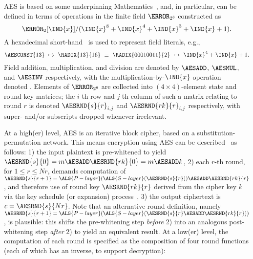 AES is based on some underpinning Mathematics~\cite[Section 4]{FIPS:197},
and, in particular, can be defined in terms of 
operations in the finite field $\F_{2^{  8}}$ constructed as
\[
\F_{2}[\IND{x}] / ( \IND{x}^{8} + \IND{x}^{4} + \IND{x}^{3} + \IND{x} + 1 ) .
\]
A hexadecimal short-hand~\cite[Section 3.2]{FIPS:197} is used to represent 
field literals, e.g.,
\[
\AESCONST{13} ~\mapsto~ \RADIX{13}{16} ~\equiv~ \RADIX{00010011}{2} ~\mapsto~ \IND{x}^4 + \IND{x} + 1 .
\]
Field 
      addition, 
multiplication, 
and  
      division
are denoted by
$\AESADD$,
$\AESMUL$,
and
$\AESINV$
respectively,
with the multiplication-by-$\IND{x}$ operation~\cite[Section 4.2.1]{FIPS:197} 
denoted .
Elements of $\F_{2^8}$ are collected into $( 4 \times 4 )$-element state
and round-key matrices; the $i$-th row and $j$-th column of such a matrix 
relating to round $r$ is denoted
$\AESRND {s}{r}_{i,j}$
and
$\AESRND{rk}{r}_{i,j}$
respectively, with super- and/or subscripts dropped whenever irrelevant.

At a high(er) level, 
AES is an iterative block cipher, based on a substitution-permutation network.
This means encryption using AES can be described~\cite[Section 5.2]{FIPS:197}
as follows:
1)    the  input  plaintext is pre-whitened to yield
      $\AESRND {s}{  0} = m \AESADD \AESRND{rk}{0} = m \AESADD k$,
2)    each $r$-th round, for $1 \leq r \leq Nr$, demands computation of
      $\AESRND {s}{r+1} = \ALG{P-layer}( \ALG{S-layer}( \AESRND{s}{r}                        ) ) \AESADD \AESRND{rk}{r}$,
      and therefore use of round key
      $\AESRND{rk}{r  }$
      derived from the cipher key $k$ via the key schedule (or expansion) process~\cite[Section 5.2]{FIPS:197},
3)    the output ciphertext is
      $c = \AESRND{s}{Nr}$.
Note that an alternative round definition, namely
      $\AESRND {s}{r+1} = \ALG{P-layer}( \ALG{S-layer}( \AESRND{s}{r} \AESADD \AESRND{rk}{r} ) )                       $ ,
is plausible: this shifts the 
 pre-whitening step {\em before} 2) 
into an analogous 
post-whitening step {\em  after} 2)
to yield an equivalent result.
At a  low(er) level,
the computation of each round is specified as the composition of four 
round functions (each of which has an inverse, to support decryption):

